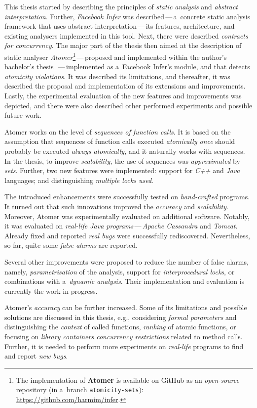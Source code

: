 This thesis started by describing the principles of \emph{static analysis}
and \emph{abstract interpretation}. Further, \emph{Facebook Infer} was
described\,---\,a~concrete static analysis framework that uses abstract
interpretation\,---\,its features, architecture, and existing analysers
implemented in this tool. Next, there were described \emph{contracts for
concurrency}. The major part of the thesis then aimed at the description of
static analyser \emph{Atomer}\footnote{The implementation of \textbf{Atomer}
is available on GitHub as an \emph{open-source} repository (in a~branch
\texttt{atomicity-sets}):
\url{https://github.com/harmim/infer}.}\,---\,proposed and implemented
within the author's bachelor's thesis~\cite{harmimBP}\,---\,implemented as
a~Facebook Infer's module, and that detects \emph{atomicity violations}.
It was described its limitations, and thereafter, it was described the
proposal and implementation of its extensions and improvements. Lastly,
the experimental evaluation of the new features and improvements was
depicted, and there were also described other performed experiments
and possible future work.

Atomer works on the level of \emph{sequences of function calls}. It is
based on the assumption that sequences of function calls executed
\emph{atomically once} should probably be executed \emph{always atomically},
and it naturally works with sequences. In the thesis, to improve
\emph{scalability}, the use of sequences was \emph{approximated} by
\emph{sets}. Further, two new features were implemented: support for
\emph{C++} and \emph{Java} languages; and distinguishing \emph{multiple
locks used}.

The introduced enhancements were successfully tested on \emph{hand-crafted}
programs. It turned out that such innovations improved the \emph{accuracy}
and \emph{scalability}. Moreover, Atomer was experimentally evaluated on
additional software. Notably, it was evaluated on \emph{real-life Java
programs}\,---\,\emph{Apache Cassandra} and \emph{Tomcat}. Already fixed
and reported \emph{real bugs} were successfully rediscovered. Nevertheless,
so far, quite some \emph{false alarms} are reported.

Several other improvements were proposed to reduce the number of false
alarms, namely, \emph{parametrisation} of the analysis, support for
\emph{interprocedural locks}, or combinations with a~\emph{dynamic analysis}.
Their implementation and evaluation is currently the work in progress.

Atomer's \emph{accuracy} can be further increased. Some of its limitations
and possible solutions are discussed in this thesis, e.g., considering
\emph{formal parameters} and distinguishing the \emph{context} of
called functions, \emph{ranking} of atomic functions, or focusing on
\emph{library containers concurrency restrictions} related to method
calls. Further, it is needed to perform more experiments on \emph{real-life}
programs to find and report \emph{new bugs}.



